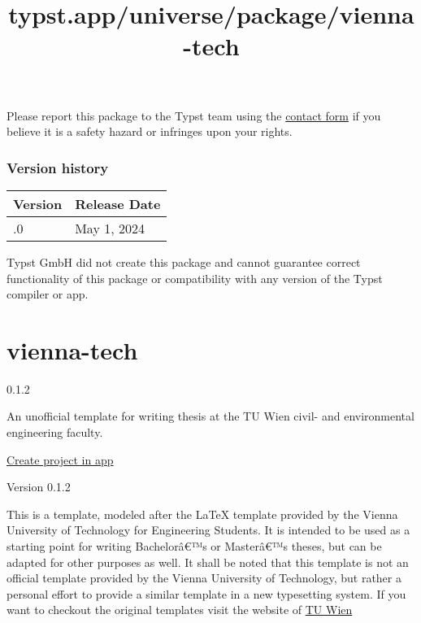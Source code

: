 Please report this package to the Typst team using the
\href{https://typst.app/contact}{contact form} if you believe it is a
safety hazard or infringes upon your rights.

\label{versions}
\subsubsection{Version history}\label{version-history}

\begin{longtable}[]{@{}ll@{}}
\toprule\noalign{}
Version & Release Date \\
\midrule\noalign{}
\endhead
\bottomrule\noalign{}
\endlastfoot
0.1.0 & May 1, 2024 \\
\end{longtable}

Typst GmbH did not create this package and cannot guarantee correct
functionality of this package or compatibility with any version of the
Typst compiler or app.


\title{typst.app/universe/package/vienna-tech}

\label{banner}
\label{template-thumbnail}

\section{vienna-tech}\label{vienna-tech}

{ 0.1.2 }

An unofficial template for writing thesis at the TU Wien civil- and
environmental engineering faculty.

\href{/app?template=vienna-tech&version=0.1.2}{Create project in app}

\label{readme}
Version 0.1.2

This is a template, modeled after the LaTeX template provided by the
Vienna University of Technology for Engineering Students. It is intended
to be used as a starting point for writing Bachelorâ€™s or Masterâ€™s
theses, but can be adapted for other purposes as well. It shall be noted
that this template is not an official template provided by the Vienna
University of Technology, but rather a personal effort to provide a
similar template in a new typesetting system. If you want to checkout
the original templates visit the website of
\href{https://www.tuwien.at/cee/edvlabor/lehre/vorlagen}{TU Wien}

